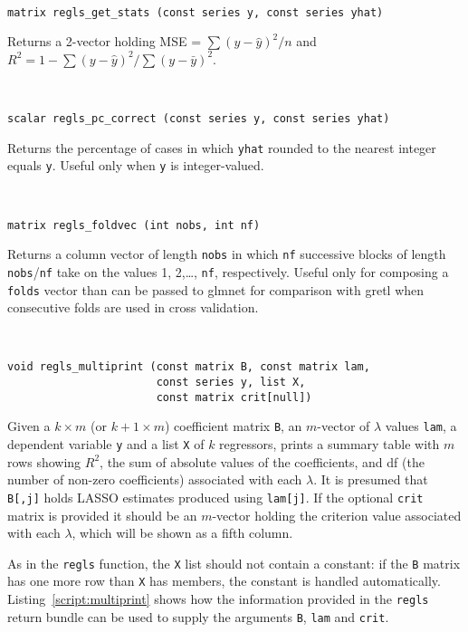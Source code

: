 \documentclass{article}
\newenvironment{funcdoc}
{\noindent\hrulefill\\[-12pt]}
{\medbreak}
\begin{document}

\begin{funcdoc}
\begin{verbatim}
matrix regls_get_stats (const series y, const series yhat)
\end{verbatim}
  Returns a 2-vector holding MSE = $\sum(y - \hat{y})^2/n$
  and $R^2 = 1 - \sum(y - \hat{y})^2/\sum(y - \bar{y})^2$.
\end{funcdoc}

\begin{funcdoc}
\begin{verbatim}
scalar regls_pc_correct (const series y, const series yhat)
\end{verbatim}
  Returns the percentage of cases in which \texttt{yhat} rounded to
  the nearest integer equals \texttt{y}. Useful only when \texttt{y}
  is integer-valued.
\end{funcdoc}

\begin{funcdoc}
\begin{verbatim}
matrix regls_foldvec (int nobs, int nf)
\end{verbatim}
  Returns a column vector of length \texttt{nobs} in which \texttt{nf}
  successive blocks of length \texttt{nobs}/\texttt{nf} take on the
  values 1, 2,\dots, \texttt{nf}, respectively. Useful only for
  composing a \texttt{folds} vector than can be passed to
  \textsf{glmnet} for comparison with gretl when consecutive folds are
  used in cross validation.
\end{funcdoc}

\begin{funcdoc}
\begin{verbatim}
void regls_multiprint (const matrix B, const matrix lam,
                       const series y, list X,
                       const matrix crit[null])
\end{verbatim}
  Given a $k \times m$ (or $k+1 \times m$) coefficient matrix
  \texttt{B}, an $m$-vector of $\lambda$ values \texttt{lam}, a
  dependent variable \texttt{y} and a list \texttt{X} of $k$
  regressors, prints a summary table with $m$ rows showing $R^2$, the
  sum of absolute values of the coefficients, and df (the number of
  non-zero coefficients) associated with each $\lambda$. It is
  presumed that \texttt{B[,j]} holds LASSO estimates produced using
  \texttt{lam[j]}. If the optional \texttt{crit} matrix is provided it
  should be an $m$-vector holding the criterion value associated with
  each $\lambda$, which will be shown as a fifth column.

  As in the \texttt{regls} function, the \texttt{X} list should not
  contain a constant: if the \texttt{B} matrix has one more row than
  \texttt{X} has members, the constant is handled
  automatically. Listing~\ref{script:multiprint} shows how the
  information provided in the \texttt{regls} return bundle can be used
  to supply the arguments \texttt{B}, \texttt{lam} and \texttt{crit}.
\end{funcdoc}
\end{document}
